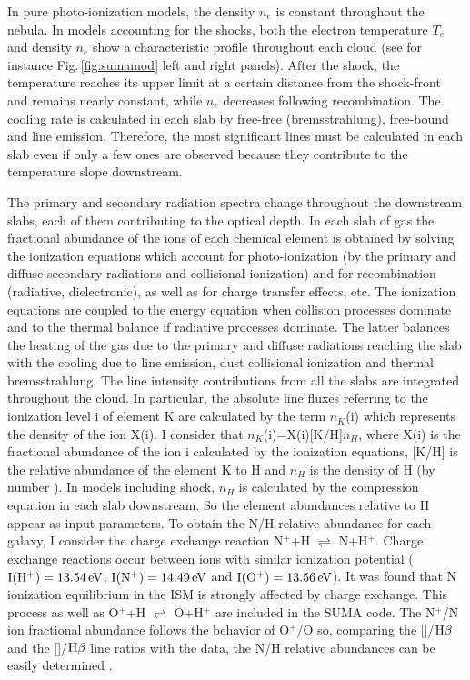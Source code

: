 \documentclass[../main.tex]{subfiles}
\begin{document}
In pure photo-ionization models, the density $n_e$ is constant throughout the nebula.
In models accounting for the shocks, both the electron temperature  $T_{e}$  and  density $n_e$ show a characteristic profile throughout each cloud (see for instance Fig.\,\ref{fig:sumamod} left and right panels). 
After the shock, the temperature reaches its upper limit at a certain distance from the shock-front and remains nearly constant, while $n_e$ decreases following recombination.
The cooling rate is calculated in each slab by free-free (bremsstrahlung), free-bound and line emission. 
Therefore, the most significant lines must be calculated in each slab even if only a few ones are observed because they contribute to the temperature slope downstream.

The primary and secondary radiation spectra change throughout the downstream slabs, each of them contributing to the optical depth. 
In each slab of gas the fractional abundance of the ions of each chemical element is obtained by solving the ionization equations which account for photo-ionization (by the primary and diffuse secondary radiations and collisional ionization) and for  recombination (radiative, dielectronic), as well as for charge transfer effects, etc. 
The ionization equations are coupled to the energy equation when collision processes dominate \citep{Cox72} and to the thermal balance if radiative processes dominate. 
The latter balances the heating of the gas due to the primary and diffuse radiations reaching the slab with the cooling due to  
line emission, dust collisional ionization and thermal bremsstrahlung. 
The line intensity contributions from all the slabs are integrated throughout the cloud.
In particular, the absolute line fluxes referring to the ionization level i of element K are calculated by the term $n_K$(i) which represents the density of the ion X(i).
I consider that $n_K$(i)=X(i)[K/H]$n_H$, where X(i) is the fractional abundance of the ion i calculated by the ionization equations, [K/H] is the relative abundance of the element K to H and $n_H$ is the density of H (by number ). 
In models including shock, $n_H$ is calculated by the compression equation in each slab downstream. 
So the element abundances relative to H appear as input parameters.
To obtain the N/H relative abundance for each galaxy, I consider the charge exchange reaction  N$^+$+H $\rightleftharpoons$ N+H$^+$. 
Charge exchange reactions occur between ions with similar ionization potential ($\rm I(H^+)=13.54\,\si{ eV}$, $\rm I(N^+)=14.49\, \si{eV}$ and $\rm I(O^+)=13.56\,\si{ eV}$). 
It was found that N ionization equilibrium in the ISM is strongly affected by charge exchange.  
This process as well as O$^+$+H $\rightleftharpoons$ O+H$^+$  are included in the SUMA code.
The N$^+$/N ion fractional abundance follows the behavior of O$^+$/O so, comparing the []/$\rm H\beta$   and the []/$\rm H\beta$ line ratios with the data, the N/H relative abundances can be easily determined \citep[see][]{Contini12}.
\end{document}
